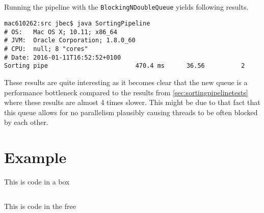 \documentclass{ituhandin}
\begin{document}
\section{}
Running the pipeline with the \texttt{BlockingNDoubleQueue} yields following results.
\begin{lstlisting}[language={},frame={}]
mac610262:src jbec$ java SortingPipeline
# OS:   Mac OS X; 10.11; x86_64
# JVM:  Oracle Corporation; 1.8.0_60
# CPU:  null; 8 "cores"
# Date: 2016-01-11T16:52:52+0100
Sorting pipe                        470.4 ms      36.56          2
\end{lstlisting}
These results are quite interesting as it becomes clear that the new queue is a performance bottleneck compared to the results from \ref{sec:sortingpipelinetests} where these results are almost 4 times slower. This might be due to that fact that this queue allows for no parallelism plausibly causing threads to be often blocked by each other.

\chapter{} %

\chapter{} %
\chapter{} %
\chapter{} %
\chapter{} %
\chapter{} %

\chapter*{Example}

This is code in a box

\begin{lstlisting}[caption=This is a caption]
\end{lstlisting}


This is code in the free

\begin{lstlisting}[frame={}]
\end{lstlisting}




\label{LastPage}
\end{document}
